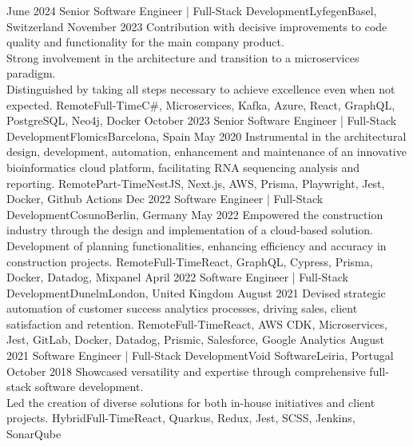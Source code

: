 %
%
%
\vspace{0.5em}
\begin{experiences}
  \experience
  {June 2024} {Senior Software Engineer | Full-Stack Development}{Lyfegen}{Basel, Switzerland}
  {November 2023}    {Contribution with decisive improvements to code quality and functionality for the main company product.\\
  Strong involvement in the architecture and transition to a microservices paradigm.\\
  Distinguished by taking all steps necessary to achieve excellence even when not expected.}
  {Remote}{Full-Time}{C\#, Microservices, Kafka, Azure, React, GraphQL, PostgreSQL, Neo4j, Docker} 
  \emptySeparator
  \experience
  {October 2023} {Senior Software Engineer | Full-Stack Development}{Flomics}{Barcelona, Spain}
  {May 2020}    {Instrumental in the architectural design, development, automation, enhancement and maintenance of an 
  innovative bioinformatics cloud platform, facilitating RNA sequencing analysis and reporting.}
  {Remote}{Part-Time}{NestJS, Next.js, AWS, Prisma, Playwright, Jest, Docker, Github Actions}
  \emptySeparator
  \experience
  {Dec 2022} {Software Engineer | Full-Stack Development}{Cosuno}{Berlin, Germany}
  {May 2022} {Empowered the construction industry through the design and implementation of a cloud-based 
  solution.\\
  Development of planning functionalities, enhancing efficiency 
  and accuracy in construction projects.}
  {Remote}{Full-Time}{React, GraphQL, Cypress, Prisma, Docker, Datadog, Mixpanel}
  \emptySeparator
  \experience
  {April 2022}   {Software Engineer | Full-Stack Development}{Dunelm}{London, United Kingdom}
  {August 2021} {Devised strategic automation of customer success analytics processes, driving sales,
  client satisfaction and retention.}
  {Remote}{Full-Time}{React,  AWS CDK, Microservices, Jest, GitLab, Docker, Datadog, Prismic, Salesforce, Google Analytics}
  \emptySeparator
  \experience
  {August 2021}     {Software Engineer | Full-Stack Development}{Void Software}{Leiria, Portugal}
  {October 2018}    {Showcased versatility and expertise through comprehensive full-stack software development.\\
  Led the creation of diverse solutions for both in-house initiatives and client projects.}
  {Hybrid}{Full-Time}{React, Quarkus, Redux, Jest, SCSS, Jenkins, SonarQube}
\end{experiences}